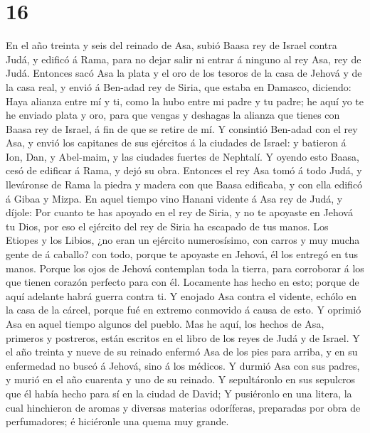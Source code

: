 \hypertarget{section-15}{%
\section{16}\label{section-15}}

 En el año treinta y seis del reinado de Asa, subió Baasa
rey de Israel contra Judá, y edificó á Rama, para no dejar salir ni
entrar á ninguno al rey Asa, rey de Judá.  Entonces sacó Asa
la plata y el oro de los tesoros de la casa de Jehová y de la casa real,
y envió á Ben-adad rey de Siria, que estaba en Damasco, diciendo:
 Haya alianza entre mí y ti, como la hubo entre mi padre y
tu padre; he aquí yo te he enviado plata y oro, para que vengas y
deshagas la alianza que tienes con Baasa rey de Israel, á fin de que se
retire de mí.  Y consintió Ben-adad con el rey Asa, y envió
los capitanes de sus ejércitos á la ciudades de Israel: y batieron á
Ion, Dan, y Abel-maim, y las ciudades fuertes de Nephtalí. 
Y oyendo esto Baasa, cesó de edificar á Rama, y dejó su obra.
 Entonces el rey Asa tomó á todo Judá, y lleváronse de Rama
la piedra y madera con que Baasa edificaba, y con ella edificó á Gibaa y
Mizpa.  En aquel tiempo vino Hanani vidente á Asa rey de
Judá, y díjole: Por cuanto te has apoyado en el rey de Siria, y no te
apoyaste en Jehová tu Dios, por eso el ejército del rey de Siria ha
escapado de tus manos.  Los Etiopes y los Libios, ¿no eran
un ejército numerosísimo, con carros y muy mucha gente de á caballo? con
todo, porque te apoyaste en Jehová, él los entregó en tus manos.
 Porque los ojos de Jehová contemplan toda la tierra, para
corroborar á los que tienen corazón perfecto para con él. Locamente has
hecho en esto; porque de aquí adelante habrá guerra contra ti.
 Y enojado Asa contra el vidente, echólo en la casa de la
cárcel, porque fué en extremo conmovido á causa de esto. Y oprimió Asa
en aquel tiempo algunos del pueblo.  Mas he aquí, los
hechos de Asa, primeros y postreros, están escritos en el libro de los
reyes de Judá y de Israel.  Y el año treinta y nueve de su
reinado enfermó Asa de los pies para arriba, y en su enfermedad no buscó
á Jehová, sino á los médicos.  Y durmió Asa con sus padres,
y murió en el año cuarenta y uno de su reinado.  Y
sepultáronlo en sus sepulcros que él había hecho para sí en la ciudad de
David; Y pusiéronlo en una litera, la cual hinchieron de aromas y
diversas materias odoríferas, preparadas por obra de perfumadores; é
hiciéronle una quema muy grande.

